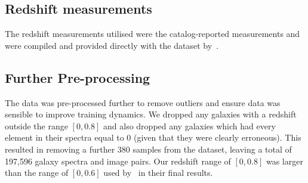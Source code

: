 \subsection{Redshift measurements}\label{subsec:redshift}
The redshift measurements utilised were the catalog-reported measurements and were compiled and provided directly with the
dataset by~\cite{astroclip}.

\subsection{Further Pre-processing}\label{subsec:pre-processing}
The data was pre-processed further to remove outliers and ensure data was sensible to improve training dynamics.
We dropped any galaxies with a redshift outside the range $[0, 0.8]$ and also dropped any galaxies which had every element
in their spectra equal to 0 (given that they were clearly erroneous).
This resulted in removing a further 380 samples from the dataset, leaving a total of 197,596 galaxy spectra and image pairs.
Our redshift range of $[0, 0.8]$ was larger than the range of $[0, 0.6]$ used by~\cite{astroclip} in their final results.
